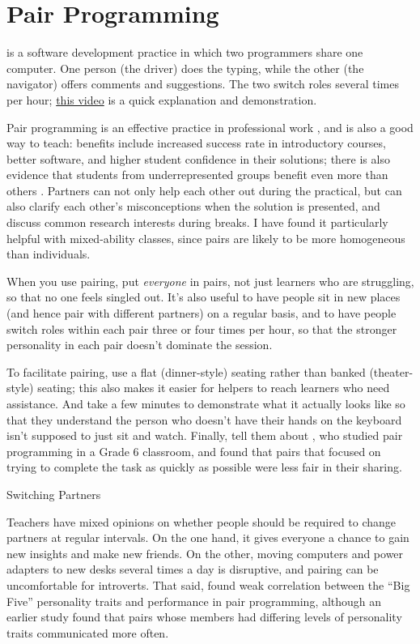 \section{Pair Programming}\label{s:classroom-pair}

 is a software
development practice in which two programmers share one computer. One
person (the driver) does the typing, while the other (the navigator)
offers comments and suggestions.  The two switch roles several times
per hour; \href{https://www.youtube.com/watch?v=vgkahOzFH2Q}{this
  video} is a quick explanation and demonstration.

Pair programming is an effective practice in professional work
\cite{Hann2009}, and is also a good way to teach: benefits include
increased success rate in introductory courses, better software, and
higher student confidence in their solutions; there is also evidence
that students from underrepresented groups benefit even more than
others \cite{McDo2006,Hank2011,Port2013,Cele2018}.  Partners can not
only help each other out during the practical, but can also clarify
each other's misconceptions when the solution is presented, and
discuss common research interests during breaks.  I have found it
particularly helpful with mixed-ability classes, since pairs are
likely to be more homogeneous than individuals.

When you use pairing, put \emph{everyone} in pairs, not just learners
who are struggling, so that no one feels singled out. It's also useful
to have people sit in new places (and hence pair with different
partners) on a regular basis, and to have people switch roles within
each pair three or four times per hour, so that the stronger
personality in each pair doesn't dominate the session.

To facilitate pairing, use a flat (dinner-style) seating rather than
banked (theater-style) seating; this also makes it easier for helpers
to reach learners who need assistance.  And take a few minutes to
demonstrate what it actually looks like so that they understand the
person who doesn't have their hands on the keyboard isn't supposed to
just sit and watch. Finally, tell them about \cite{Lewi2015}, who
studied pair programming in a Grade 6 classroom, and found that pairs
that focused on trying to complete the task as quickly as possible
were less fair in their sharing.

\begin{callout}{Switching Partners}

  Teachers have mixed opinions on whether people should be required to
  change partners at regular intervals. On the one hand, it gives
  everyone a chance to gain new insights and make new friends. On the
  other, moving computers and power adapters to new desks several
  times a day is disruptive, and pairing can be uncomfortable for
  introverts.  That said, \cite{Hann2010} found weak correlation
  between the ``Big Five'' personality traits and performance in pair
  programming, although an earlier study \cite{Wall2009} found that
  pairs whose members had differing levels of personality traits
  communicated more often.

\end{callout}


